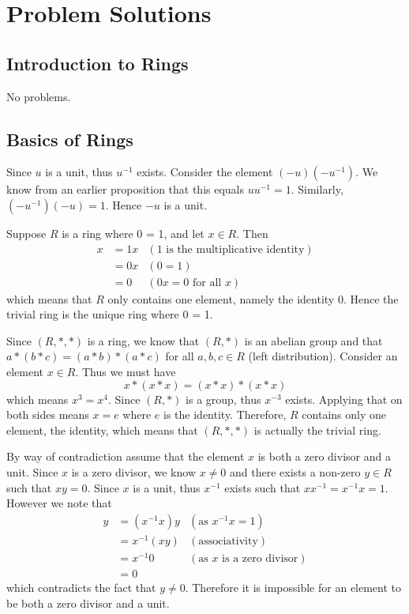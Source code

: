 \chapter{Problem Solutions}
\section{Introduction to Rings}
No problems.

\section{Basics of Rings}
\begin{questions}
    \item Since $u$ is a unit, thus $u^{-1}$ exists. Consider the element $(-u)(-u^{-1})$. We know from an earlier proposition that this equals $uu^{-1} = 1$. Similarly, $(-u^{-1})(-u) = 1$. Hence $-u$ is a unit.

    \item Suppose $R$ is a ring where 0 = 1, and let $x \in R$. Then
    \begin{align*}
        x &= 1x & (1 \text{ is the multiplicative identity})\\
        &= 0x & (0 = 1)\\
        &= 0 & (0x = 0 \text{ for all }x)
    \end{align*}
    which means that $R$ only contains one element, namely the identity 0. Hence the trivial ring is the unique ring where 0 = 1.

    \item Since $(R, \ast, \ast)$ is a ring, we know that $(R, \ast)$ is an abelian group and that $a \ast(b\ast c) = (a \ast b) \ast (a \ast c)$ for all $a, b, c \in R$ (left distribution). Consider an element $x \in R$. Thus we must have
    \[
        x \ast (x \ast x) = (x \ast x) \ast (x \ast x)    
    \]
    which means $x^3 = x^4$. Since $(R, \ast)$ is a group, thus $x^{-3}$ exists. Applying that on both sides means $x = e$ where $e$ is the identity. Therefore, $R$ contains only one element, the identity, which means that $(R, \ast, \ast)$ is actually the trivial ring.

    \item By way of contradiction assume that the element $x$ is both a zero divisor and a unit. Since $x$ is a zero divisor, we know $x \neq 0$ and there exists a non-zero $y \in R$ such that $xy = 0$. Since $x$ is a unit, thus $x^{-1}$ exists such that $xx^{-1} = x^{-1}x = 1$. However we note that
    \begin{align*}
        y &= (x^{-1}x)y & (\text{as }x^{-1}x = 1)\\
        &= x^{-1}(xy) & (\text{associativity})\\
        &= x^{-1}0 & (\text{as }x \text{ is a zero divisor})\\
        &= 0
    \end{align*}
    which contradicts the fact that $y \neq 0$. Therefore it is impossible for an element to be both a zero divisor and a unit.


\end{questions}
